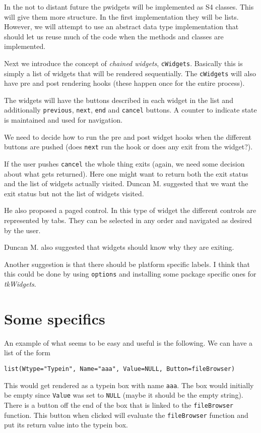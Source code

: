 \documentclass{article}
\begin{document}
In the not to distant future the pwidgets will be implemented as S4
classes. This will give them more structure. In the first
implementation they will be lists. However, we will attempt to use an
abstract data type implementation that should let us reuse much of the
code when the methods and classes are implemented.

Next we introduce the concept of {\em chained widgets},
\verb+cWidgets+. 
Basically this is simply a list of widgets that will be rendered
sequentially. 
The \verb+cWidgets+ will also have pre and post rendering hooks (these
happen once for the entire process).

The widgets will have the buttons described in each widget in the list
and additionally \verb+previous+, \verb+next+, \verb+end+ and
\verb+cancel+ buttons.
A counter to indicate state is maintained and used for navigation.

We need to decide how to run the pre and post widget hooks when the
different buttons are pushed (does \verb+next+ run the hook or does
any exit from the widget?).

If the user pushes \verb+cancel+ the whole thing exits (again, we need
some decision about what gets returned). Here one might want to return
both the exit status and the list of widgets actually visited.
Duncan M. suggested that we want the exit status but not the list of
widgets visited.

He also proposed a paged control. In this type of widget the different
controls are represented by tabs. They can be selected in any order
and navigated as desired by the user.

Duncan M. also suggested that widgets should know why they are
exiting.

Another suggestion is that there should be platform specific labels.
I think that this could be done by using \verb+options+ and installing
some package specific ones for {\em tkWidgets}.

\section*{Some specifics}

An example of what seems to be easy and useful is the following.
We can have a list of the form
\begin{verbatim}
list(Wtype="Typein", Name="aaa", Value=NULL, Button=fileBrowser)
\end{verbatim}
This would get rendered as a typein box with name \verb+aaa+. The box
would initially be empty since \verb+Value+ was set to \verb+NULL+
(maybe it should be the empty string). There is a button off the end
of the box that is linked to the \verb+fileBrowser+ function.
This button when clicked will evaluate the \verb+fileBrowser+ function
and put its return value into the typein box.
\end{document}
